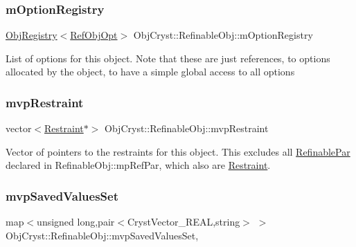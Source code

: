 \subsubsection{\texorpdfstring{mOptionRegistry}{mOptionRegistry}}
{\footnotesize\ttfamily \mbox{\hyperlink{class_obj_cryst_1_1_obj_registry}{Obj\+Registry}}$<$\mbox{\hyperlink{class_obj_cryst_1_1_ref_obj_opt}{Ref\+Obj\+Opt}}$>$ Obj\+Cryst\+::\+Refinable\+Obj\+::m\+Option\+Registry\hspace{0.3cm}{\ttfamily [protected]}}

List of options for this object. Note that these are just references, to options allocated by the object, to have a simple global access to all options \mbox{\label{class_obj_cryst_1_1_refinable_obj_ad3b06da1eb64191be95934c097829efc}} 
\subsubsection{\texorpdfstring{mvpRestraint}{mvpRestraint}}
{\footnotesize\ttfamily vector$<$\mbox{\hyperlink{class_obj_cryst_1_1_restraint}{Restraint}}$\ast$$>$ Obj\+Cryst\+::\+Refinable\+Obj\+::mvp\+Restraint\hspace{0.3cm}{\ttfamily [protected]}}

Vector of pointers to the restraints for this object. This excludes all \mbox{\hyperlink{class_obj_cryst_1_1_refinable_par}{Refinable\+Par}} declared in Refinable\+Obj\+::mp\+Ref\+Par, which also are \mbox{\hyperlink{class_obj_cryst_1_1_restraint}{Restraint}}. \mbox{\label{class_obj_cryst_1_1_refinable_obj_a22adaed8c98377e45800e5d8624531a2}} 
\subsubsection{\texorpdfstring{mvpSavedValuesSet}{mvpSavedValuesSet}}
{\footnotesize\ttfamily map$<$unsigned long,pair$<$Cryst\+Vector\+\_\+\+R\+E\+AL,string$>$ $>$ Obj\+Cryst\+::\+Refinable\+Obj\+::mvp\+Saved\+Values\+Set\hspace{0.3cm}{\ttfamily [mutable]}, {\ttfamily [protected]}}

